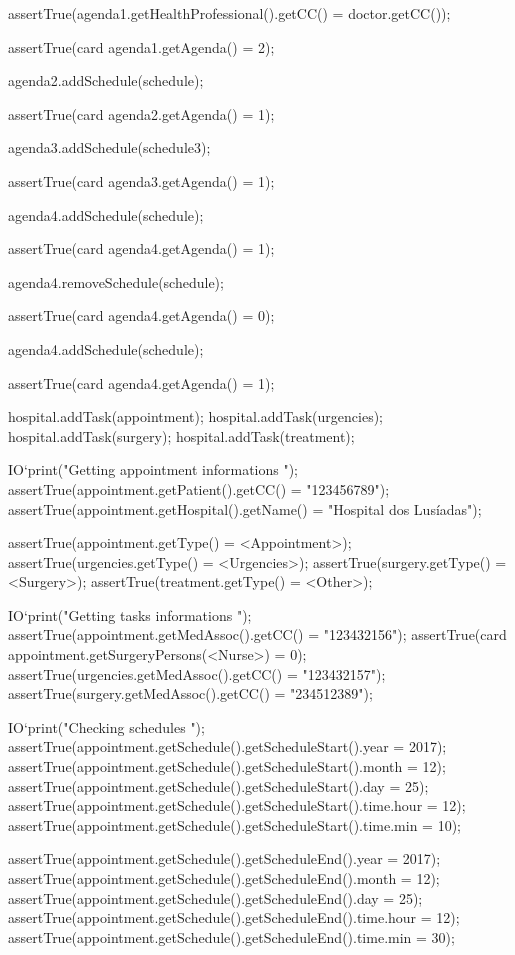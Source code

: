 \begin{vdmpp}[breaklines=true]
   assertTrue(agenda1.getHealthProfessional().getCC() = doctor.getCC());
   
   assertTrue(card agenda1.getAgenda() = 2);
   
   agenda2.addSchedule(schedule);
   
   assertTrue(card agenda2.getAgenda() = 1);
  
   agenda3.addSchedule(schedule3);
   
   assertTrue(card agenda3.getAgenda() = 1);
   
   agenda4.addSchedule(schedule);
   
   assertTrue(card agenda4.getAgenda() = 1);
   
   agenda4.removeSchedule(schedule);
   
   assertTrue(card agenda4.getAgenda() = 0);
   
   agenda4.addSchedule(schedule);
   
   assertTrue(card agenda4.getAgenda() = 1);
   
   hospital.addTask(appointment);
   hospital.addTask(urgencies);
   hospital.addTask(surgery);
   hospital.addTask(treatment);
   
   IO`print("\n Getting appointment informations \n");
   assertTrue(appointment.getPatient().getCC() = "123456789");
   assertTrue(appointment.getHospital().getName() = "Hospital dos Lusíadas");
   
   assertTrue(appointment.getType() = <Appointment>);
   assertTrue(urgencies.getType() = <Urgencies>);
   assertTrue(surgery.getType() = <Surgery>);
   assertTrue(treatment.getType() = <Other>);
  
   IO`print("\n Getting tasks informations \n");
   assertTrue(appointment.getMedAssoc().getCC() = "123432156");
   assertTrue(card appointment.getSurgeryPersons(<Nurse>) = 0);
   assertTrue(urgencies.getMedAssoc().getCC() = "123432157");
   assertTrue(surgery.getMedAssoc().getCC() = "234512389");
   
   IO`print("\n Checking schedules \n");
   assertTrue(appointment.getSchedule().getScheduleStart().year = 2017);
   assertTrue(appointment.getSchedule().getScheduleStart().month = 12);
   assertTrue(appointment.getSchedule().getScheduleStart().day = 25);
   assertTrue(appointment.getSchedule().getScheduleStart().time.hour = 12);
   assertTrue(appointment.getSchedule().getScheduleStart().time.min = 10);
   
   assertTrue(appointment.getSchedule().getScheduleEnd().year = 2017);
   assertTrue(appointment.getSchedule().getScheduleEnd().month = 12);
   assertTrue(appointment.getSchedule().getScheduleEnd().day = 25);
   assertTrue(appointment.getSchedule().getScheduleEnd().time.hour = 12);
   assertTrue(appointment.getSchedule().getScheduleEnd().time.min = 30);
   

\end{vdmpp}

